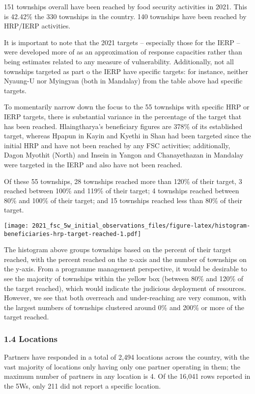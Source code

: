 \documentclass[
]{article}
\begin{document}
151 townships overall have been reached by food security activities in
2021. This is 42.42\% the 330 townships in the country. 140 townships
have been reached by HRP/IERP activities.

It is important to note that the 2021 targets -- especially those for
the IERP -- were developed more of as an approximation of response
capacities rather than being estimates related to any measure of
vulnerability. Additionally, not all townships targeted as part o the
IERP have specific targets: for instance, neither Nyaung-U nor Myingyan
(both in Mandalay) from the table above had specific targets.

To momentarily narrow down the focus to the 55 townships with specific
HRP or IERP targets, there is substantial variance in the percentage of
the target that has been reached. Hlaingtharya's beneficiary figures are
378\% of its established target, whereas Hpapun in Kayin and Kyethi in
Shan had been targeted since the initial HRP and have not been reached
by any FSC activities; additionally, Dagon Myothit (North) and Insein in
Yangon and Chanayethazan in Mandalay were targeted in the IERP and also
have not been reached.

Of these 55 townships, 28 townships reached more than 120\% of their
target, 3 reached between 100\% and 119\% of their target; 4 townships
reached between 80\% and 100\% of their target; and 15 townships reached
less than 80\% of their target.

\texttt{[image: 2021\_fsc\_5w\_initial\_observations\_files/figure-latex/histogram-beneficiaries-hrp-target-reached-1.pdf]}

The histogram above groups townships based on the percent of their
target reached, with the percent reached on the x-axis and the number of
townships on the y-axis. From a programme management perspective, it
would be desirable to see the majority of townships within the yellow
box (between 80\% and 120\% of the target reached), which would indicate
the judicious deployment of resources. However, we see that both
overreach and under-reaching are very common, with the largest numbers
of townships clustered around 0\% and 200\% or more of the target
reached.

\hypertarget{locations}{%
\subsubsection{1.4 Locations}\label{locations}}

Partners have responded in a total of 2,494 locations across the
country, with the vast majority of locations only having only one
partner operating in them; the maximum number of partners in any
location is 4. Of the 16,041 rows reported in the 5Ws, only 211 did not
report a specific location.
\end{document}
